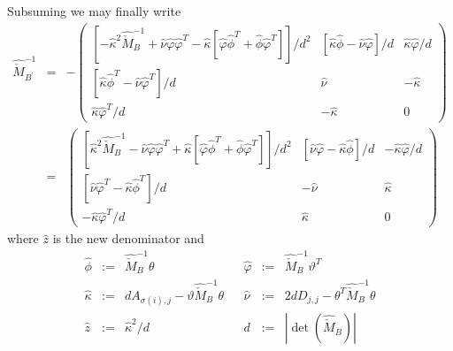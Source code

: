 \documentclass[a4paper]{article}
\begin{document}
Subsuming we may finally write
\begin{eqnarray}
\label{def:update_Z3}
\hat{\check{M}}_{B^{\prime}}^{-1}
&=&
-
\left(
\begin{array}{c|c|c}
\left[
  -\hat{\kappa}^{2}\hat{\check{M}}_{B}^{-1}
  +\hat{\nu}\hat{\varphi}\hat{\varphi}^{T}
  -\hat{\kappa}
  \left[
    \hat{\varphi}\hat{\phi}^{T}+\hat{\phi}\hat{\varphi}^{T}
  \right]
\right] / d^{2}
&
\left[
  \hat{\kappa}\hat{\phi} - \hat{\nu}\hat{\varphi}
\right] /d
&
  \hat{\kappa}\hat{\varphi} / d
\\
\hline
\left[
  \hat{\kappa}\hat{\phi}^{T} - \hat{\nu}\hat{\varphi}^{T}
\right] /d
&
\hat{\nu}
&
-\hat{\kappa}
\\
\hline
\hat{\kappa}\hat{\varphi}^{T} /d
&
-\hat{\kappa}
&
0
\end{array}
\right)
\nonumber \\
&=&
\left(
\begin{array}{c|c|c}
\left[
  \hat{\kappa}^{2}\hat{\check{M}}_{B}^{-1}
  -\hat{\nu}\hat{\varphi}\hat{\varphi}^{T}
  +\hat{\kappa}
  \left[
    \hat{\varphi}\hat{\phi}^{T}+\hat{\phi}\hat{\varphi}^{T}
  \right]
\right] / d^{2}
&
\left[
  \hat{\nu}\hat{\varphi} - \hat{\kappa}\hat{\phi}
\right] /d
&
-\hat{\kappa}\hat{\varphi} / d
\\
\hline
\left[
  \hat{\nu}\hat{\varphi}^{T} - \hat{\kappa}\hat{\phi}^{T}
\right] /d
&
-\hat{\nu}
&
\hat{\kappa}
\\
\hline
-\hat{\kappa}\hat{\varphi}^{T} /d
&
\hat{\kappa}
&
0
\end{array}
\right)
\end{eqnarray}
where $\hat{z}$ is the new denominator and 
\begin{equation}
\label{def:update_Z3_entities}
\begin{array}{rclcrcl}
\hat{\phi} &:=& \hat{\check{M}}_{B}^{-1}\theta
&&
\hat{\varphi} &:=& \hat{\check{M}}_{B}^{-1}\vartheta^{T}
\\
\hat{\kappa} &:=& dA_{\sigma(i), j}-\vartheta\hat{\check{M}}_{B}^{-1}\theta
&&
\hat{\nu} &:=& 2dD_{j,j}-\theta^{T}\hat{\check{M}}_{B}^{-1}\theta
\\
\hat{z} &:=& \hat{\kappa}^{2} / d
&&
d &:=& \left|\det(\hat{\check{M}}_{B})\right|
\end{array}
\end{equation}
\end{document}
